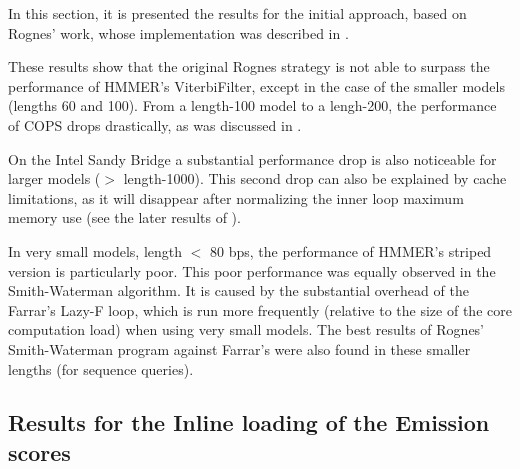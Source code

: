 In this section, it is presented the results for the initial approach, based on Rognes' work, whose implementation was described in . 

These results show that the original Rognes strategy is not able to surpass the performance of HMMER's ViterbiFilter, except in the case of the smaller models (lengths 60 and 100). From a length-100 model to a lengh-200, the performance of COPS drops drastically, as was discussed in .

On the Intel Sandy Bridge a substantial performance drop is also noticeable for larger models ($>$ length-1000). This second drop can also be explained by cache limitations, as it will disappear after normalizing the inner loop maximum memory use (see the later results of ).

In very small models, length $<$ 80 bps, the performance of HMMER's striped version is particularly poor. This poor performance  was equally observed in the Smith-Waterman algorithm. It is caused by the substantial overhead of the Farrar's Lazy-F loop, which is run more frequently (relative to the size of the core computation load) when using very small models. The best results of Rognes' Smith-Waterman program against Farrar's were also found in these smaller lengths (for sequence queries).



\subsection{Results for the Inline loading of the Emission scores}
\label{Results for the Inline loading of the Emission scores}

